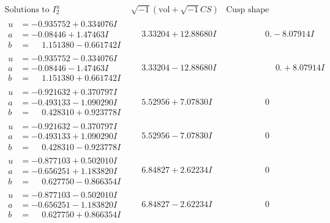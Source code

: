 \documentclass[1p]{elsarticle_modified}
\theoremstyle{definition}
\newcommand{\I}{\sqrt{-1}}
\begin{document}
$$\begin{array}{c|c|c}  
\text{Solutions to }I^u_{2}& \I (\text{vol} + \sqrt{-1}CS) & \text{Cusp shape}\\
 \hline 
\begin{aligned}
u &= -0.935752 + 0.334076 I \\
a &= -0.08446 + 1.47463 I \\
b &= \phantom{-}1.151380 - 0.661742 I\end{aligned}
 & \phantom{-}3.33204 + 12.88680 I & \phantom{-0.000000 } 0. - 8.07914 I \\ \hline\begin{aligned}
u &= -0.935752 - 0.334076 I \\
a &= -0.08446 - 1.47463 I \\
b &= \phantom{-}1.151380 + 0.661742 I\end{aligned}
 & \phantom{-}3.33204 - 12.88680 I & \phantom{-0.000000 -}0. + 8.07914 I \\ \hline\begin{aligned}
u &= -0.921632 + 0.370797 I \\
a &= -0.493133 - 1.090290 I \\
b &= \phantom{-}0.428310 + 0.923778 I\end{aligned}
 & \phantom{-}5.52956 + 7.07830 I & \phantom{-0.000000 } 0 \\ \hline\begin{aligned}
u &= -0.921632 - 0.370797 I \\
a &= -0.493133 + 1.090290 I \\
b &= \phantom{-}0.428310 - 0.923778 I\end{aligned}
 & \phantom{-}5.52956 - 7.07830 I & \phantom{-0.000000 } 0 \\ \hline\begin{aligned}
u &= -0.877103 + 0.502010 I \\
a &= -0.656251 + 1.183820 I \\
b &= \phantom{-}0.627750 - 0.866354 I\end{aligned}
 & \phantom{-}6.84827 + 2.62234 I & \phantom{-0.000000 } 0 \\ \hline\begin{aligned}
u &= -0.877103 - 0.502010 I \\
a &= -0.656251 - 1.183820 I \\
b &= \phantom{-}0.627750 + 0.866354 I\end{aligned}
 & \phantom{-}6.84827 - 2.62234 I & \phantom{-0.000000 } 0 \\ \hline\begin{aligned}

\end{aligned}
\end{array}$$
\end{document}
